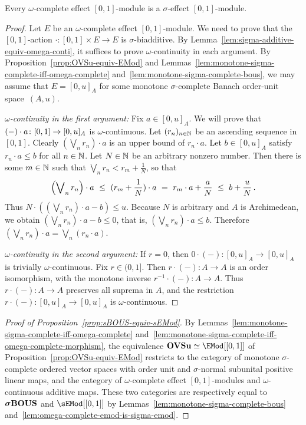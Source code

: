 \documentclass[%
	submission,
copyright,creativecommons,UKenglish]{eptcs}
\begin{document}
\begin{lemma}
\label{lem:omega-complete-emod-is-sigma-emod}
Every $\omega$-complete effect $[0,1]$-module
is a $\sigma$-effect $[0,1]$-module.
\end{lemma}
\begin{proof}
Let $E$ be an $\omega$-complete effect $[0,1]$-module.
We need to prove that
the $[0,1]$-action $\cdot\colon [0,1]\times E\to E$
is $\sigma$-biadditive.
By Lemma~\ref{lem:sigma-additive-equiv-omega-conti},
it suffices to prove $\omega$-continuity in each argument.
By Proposition~\ref{prop:OVSu-equiv-EMod}
and Lemmas~\ref{lem:monotone-sigma-complete-iff-omega-complete}
and~\ref{lem:monotone-sigma-complete-bous},
we may assume that $E=[0,u]_A$ for
some monotone $\sigma$-complete Banach order-unit space~$(A,u)$.

\textit{$\omega$-continuity in the first argument:}
Fix $a\in [0,u]_{A}$. We will prove that
$(-)\cdot a\colon [0,1]\to [0,u]_{A}$ is $\omega$-continuous.
Let $(r_n)_{n\in\mathbb{N}}$ be an ascending sequence in $[0,1]$.
Clearly $(\bigvee_n r_n)\cdot a$ is an upper bound
of $r_n\cdot a$.
Let $b\in[0,u]_{A}$ satisfy
$r_n\cdot a\le b$ for all $n\in\mathbb{N}$.
Let $N\in\mathbb{N}$ be an arbitrary nonzero number.
Then there is some $m\in\mathbb{N}$ such that
$\bigvee_n r_n< r_m + \frac{1}{N}$,
so that
\[
\qty\Big(\bigvee\nolimits_n r_n)\cdot a
\ \le\  (r_m + \frac{1}{N})\cdot a
\ = \  r_m\cdot a + \frac{a}{N}
\ \le\  b + \frac{u}{N}
\,\text{.}
\]
Thus $N\cdot ((\bigvee\nolimits_n r_n)\cdot a - b)\le u$.
Because $N$ is arbitrary and $A$ is Archimedean,
we obtain $(\bigvee\nolimits_n r_n)\cdot a - b\le 0$,
that is, $(\bigvee\nolimits_n r_n)\cdot a\le b$.
Therefore $(\bigvee\nolimits_n r_n)\cdot a=
\bigvee_n (r_n\cdot a)$.

\textit{$\omega$-continuity in the second argument:}
If $r=0$, then $0\cdot (-)\colon [0,u]_{A}\to[0,u]_{A}$
is trivially $\omega$-continuous.
Fix $r\in (0,1]$.
Then $r\cdot (-)\colon A\to A$
is an order isomorphism, with
the monotone inverse $r^{-1}\cdot (-)\colon A\to A$.
Thus $r\cdot (-)\colon A\to A$
preserves all suprema in $A$,
and the restriction
$r\cdot (-)\colon [0,u]_{A}\to [0,u]_{A}$
is $\omega$-continuous.
\end{proof}


\begin{proof}[Proof of Proposition~\ref{prop:sBOUS-equiv-sEMod}]
By Lemmas~\ref{lem:monotone-sigma-complete-iff-omega-complete}
and~\ref{lem:monotone-sigma-complete-iff-omega-complete-morphism},
the equivalence $\OVSu\simeq\EMod[[0,1]]$
of Proposition~\ref{prop:OVSu-equiv-EMod}
restricts to the category
of monotone $\sigma$-complete ordered vector spaces
with order unit and $\sigma$-normal subunital positive linear maps,
and the category of
$\omega$-complete effect $[0,1]$-modules
and $\omega$-continuous additive maps.
These two categories are respectively equal to $\boldsymbol{\sigma}\mathbf{BOUS}$
and $\sEMod[[0,1]]$
by Lemmas~\ref{lem:monotone-sigma-complete-bous}
and~\ref{lem:omega-complete-emod-is-sigma-emod}.
\end{proof}
\end{document}
